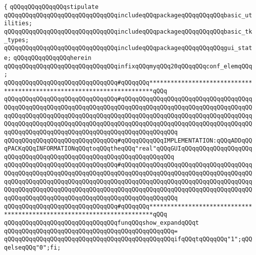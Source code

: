 \verb|{|\newline
\verb|qQQqqQQqqQQqqQQqstipulate|\newline
\newline
\verb|qQQqqQQqqQQqqQQqqQQqqQQqqQQqqQQqincludeqQQqpackageqQQqqQQqqQQqbasic_utilities;|\newline
\verb|qQQqqQQqqQQqqQQqqQQqqQQqqQQqqQQqincludeqQQqpackageqQQqqQQqqQQqbasic_tk_types;|\newline
\verb|qQQqqQQqqQQqqQQqqQQqqQQqqQQqqQQqincludeqQQqpackageqQQqqQQqqQQqgui_state;|\newline
\newline
\verb|qQQqqQQqqQQqqQQqherein|\newline
\newline
\verb|qQQqqQQqqQQqqQQqqQQqqQQqqQQqqQQqinfixqQQqmyqQQq20qQQqqQQqconf_elemqQQq;|\newline
\newline
\verb|qQQqqQQqqQQqqQQqqQQqqQQqqQQqqQQq#qQQqqQQq***********************************************************************qQQq|\newline
\verb|qQQqqQQqqQQqqQQqqQQqqQQqqQQqqQQq#qQQqqQQqqQQqqQQqqQQqqQQqqQQqqQQqqQQqqQQqqQQqqQQqqQQqqQQqqQQqqQQqqQQqqQQqqQQqqQQqqQQqqQQqqQQqqQQqqQQqqQQqqQQqqQQqqQQqqQQqqQQqqQQqqQQqqQQqqQQqqQQqqQQqqQQqqQQqqQQqqQQqqQQqqQQqqQQqqQQqqQQqqQQqqQQqqQQqqQQqqQQqqQQqqQQqqQQqqQQqqQQqqQQqqQQqqQQqqQQqqQQqqQQqqQQqqQQqqQQqqQQqqQQqqQQqqQQqqQQqqQQqqQQqqQQqqQQq|\newline
\verb|qQQqqQQqqQQqqQQqqQQqqQQqqQQqqQQq#qQQqqQQqqQQqIMPLEMENTATION:qQQqADDqQQqPACKqQQqINFORMATIONqQQqtoqQQqtheqQQq"real"qQQqGUIqQQqqQQqqQQqqQQqqQQqqQQqqQQqqQQqqQQqqQQqqQQqqQQqqQQqqQQqqQQqqQQqqQQq|\newline
\verb|qQQqqQQqqQQqqQQqqQQqqQQqqQQqqQQq#qQQqqQQqqQQqqQQqqQQqqQQqqQQqqQQqqQQqqQQqqQQqqQQqqQQqqQQqqQQqqQQqqQQqqQQqqQQqqQQqqQQqqQQqqQQqqQQqqQQqqQQqqQQqqQQqqQQqqQQqqQQqqQQqqQQqqQQqqQQqqQQqqQQqqQQqqQQqqQQqqQQqqQQqqQQqqQQqqQQqqQQqqQQqqQQqqQQqqQQqqQQqqQQqqQQqqQQqqQQqqQQqqQQqqQQqqQQqqQQqqQQqqQQqqQQqqQQqqQQqqQQqqQQqqQQqqQQqqQQqqQQqqQQqqQQqqQQq|\newline
\verb|qQQqqQQqqQQqqQQqqQQqqQQqqQQqqQQq#qQQqqQQq***********************************************************************qQQq|\newline
\newline
\verb|qQQqqQQqqQQqqQQqqQQqqQQqqQQqqQQqfunqQQqshow_expandqQQqt|\newline
\verb|qQQqqQQqqQQqqQQqqQQqqQQqqQQqqQQqqQQqqQQqqQQqqQQq=|\newline
\verb|qQQqqQQqqQQqqQQqqQQqqQQqqQQqqQQqqQQqqQQqqQQqqQQqifqQQqtqQQqqQQq"1";qQQqelseqQQq"0";fi;|\newline
